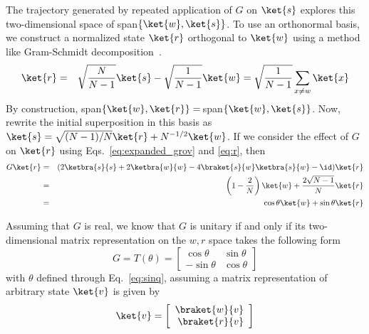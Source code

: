 \documentclass[11pt,oneside,final]{huthesis}%
\begin{document}
The trajectory generated by repeated application of $G$ on $\ket{s}$ explores this two-dimensional space of span$\{\ket{w},\ket{s}\}$.  To use an orthonormal basis, we construct a normalized state $\ket{r}$ orthogonal to $\ket{w}$ using a method like Gram-Schmidt decomposition~\cite{Horn05}. 
\begin{eqnarray}
	\ket{r}&=&  \sqrt{\frac{N}{N-1}}\ket{s}-\sqrt{\frac{1}{N-1}}\ket{w}=\sqrt{\frac{1}{N-1}}\sum_{x\neq w}\ket{x}
	\label{eq:r}
\end{eqnarray}
By construction, span$\{\ket{w},\ket{r}\}=\,$span$\{\ket{w},\ket{s}\}$.  Now, rewrite the initial superposition in this basis as $\ket{s}=\sqrt{(N-1)/N}\ket{r}+N^{-1/2}\ket{w}$.
If we consider the effect of $G$ on $\ket{r}$ using Eqs.~\eqref{eq:expanded_grov} and \eqref{eq:r}, then 
\begin{eqnarray}
	G\ket{r}&=& (2\ketbra{s}{s}+2\ketbra{w}{w}-4\braket{s}{w}\ketbra{s}{w}-\id)\ket{r}\\
	&=& \left(1-\frac{2}{N}\right)\ket{w}+\frac{2\sqrt{N-1}}{N}\ket{r}\\
	&=& \cos\theta\ket{w}+\sin\theta\ket{r}\label{eq:sinq}
\end{eqnarray}

Assuming that $G$ is real, we know that $G$ is unitary if and only if its two-dimensional matrix representation on the $w,r$ space takes the following form
\begin{equation}
	G=T(\theta)=\left[ \begin{array}{rr}
		\cos \theta & \sin \theta\\
		- \sin \theta&\cos \theta 
	\end{array}\right]
	\label{eq:GRot}
\end{equation}
with $\theta$ defined through Eq.~\eqref{eq:sinq}, assuming a matrix representation of arbitrary state $\ket{v}$ is given by
\[
\ket{v}=\left[ \begin{array}{rr}
	\braket{w}{v}\\
	\braket{r}{v}\\
\end{array}\right]
\]

\end{document}
